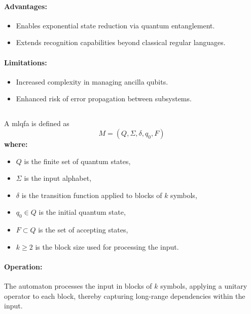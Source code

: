 \paragraph{Advantages:}
\begin{itemize}
    \item Enables exponential state reduction via quantum entanglement.
    \item Extends recognition capabilities beyond classical regular languages.
\end{itemize}

\paragraph{Limitations:}
\begin{itemize}
    \item Increased complexity in managing ancilla qubits.
    \item Enhanced risk of error propagation between subsystems.
\end{itemize}

\subsection{}
\label{subsec:ml-qfa}
\begin{definition}
A \gls{mlqfa} is defined as 
\[
M = (Q, \Sigma, \delta, q_0, F)
\]
\textbf{where:}
\begin{itemize}
    \item \( Q \) is the finite set of quantum states,
    \item \( \Sigma \) is the input alphabet,
    \item \( \delta \) is the transition function applied to blocks of \( k \) symbols,
    \item \( q_0 \in Q \) is the initial quantum state,
    \item \( F \subset Q \) is the set of accepting states,
    \item \( k \geq 2 \) is the block size used for processing the input.
\end{itemize}
\end{definition}

\paragraph{Operation:}  
The automaton processes the input in blocks of \( k \) symbols, applying a unitary operator to each block, thereby capturing long-range dependencies within the input.

